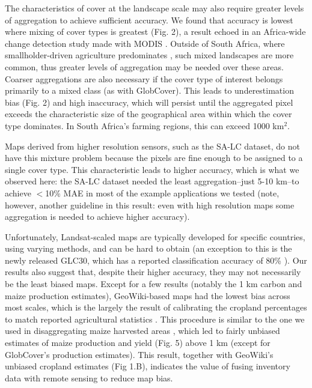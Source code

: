 \documentclass[a4paper]{article}
\begin{document}
The characteristics of cover at the landscape scale may also require greater levels of aggregation to achieve sufficient accuracy. We found that accuracy is lowest where mixing of cover types is greatest (Fig. 2), a result echoed in an Africa-wide change detection study made with MODIS \citep{gross_monitoring_2013}. Outside of South Africa, where smallholder-driven agriculture predominates \citep{lambin_estimating_2013}, such mixed landscapes are more common, thus greater levels of aggregation may be needed over these areas. Coarser aggregations are also necessary if the cover type of interest belongs primarily to a mixed class (as with GlobCover). This leads to underestimation bias (Fig. 2) and high inaccuracy, which will persist until the aggregated pixel exceeds the characteristic size of the geographical area within which the cover type dominates. In South Africa's farming regions, this can exceed 1000 km$^2$. 

Maps derived from higher resolution sensors, such as the SA-LC dataset, do not have this mixture problem because the pixels are fine enough to be assigned to a single cover type. This characteristic leads to higher accuracy, which is what we observed here: the SA-LC dataset needed the least aggregation--just 5-10 km--to achieve $<$10\% MAE in most of the example applications we tested (note, however, another guideline in this result: even with high resolution maps some aggregation is needed to achieve higher accuracy).


Unfortunately, Landsat-scaled maps are typically developed for specific countries, using varying methods, and can be hard to obtain (an exception to this is the newly released GLC30, which has a reported classification accuracy of 80\% \citep{chen_global_2015}). Our results also suggest that, despite their higher accuracy, they may not necessarily be the least biased maps. Except for a few results (notably the 1 km carbon and maize production estimates), GeoWiki-based maps had the lowest bias across most scales, which is the largely the result of calibrating the cropland percentages to match reported agricultural statistics \citep{fritz_cropland_2011,fritz_mapping_2015}. This procedure is similar to the one we used in disaggregating maize harvested areas \citep{ramankutty_farming_2008, monfreda_farming_2008}, which led to fairly unbiased estimates of maize production and yield (Fig. 5) above 1 km (except for GlobCover's production estimates). This result, together with GeoWiki's unbiased cropland estimates (Fig 1.B), indicates the value of fusing inventory data with remote sensing to reduce map bias. 
\end{document}
